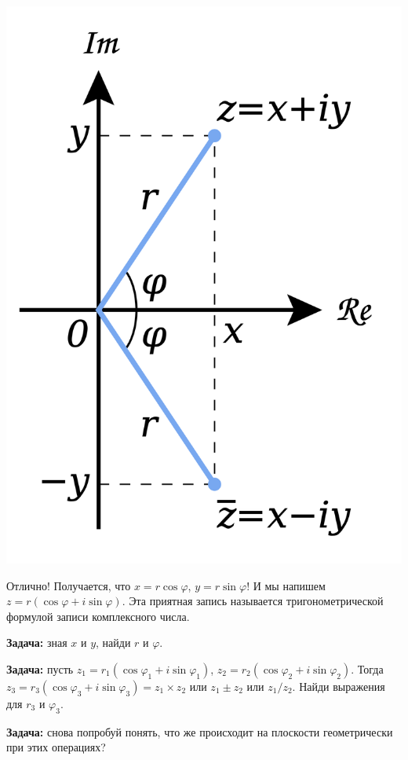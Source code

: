 \documentclass[12pt]{article}
\begin{document}
\begin{center}
\includegraphics[scale=0.1]{cn_plane_phi.png}
\end{center}

Отлично! Получается, что $x = r \cos \varphi$, $y = r \sin \varphi$! И мы напишем $z = r \left( \cos \varphi + i \sin \varphi \right)$. Эта приятная запись называется тригонометрической формулой записи комплексного числа.

{\bf Задача:} зная $x$ и $y$, найди $r$ и $\varphi$.

{\bf Задача:} пусть $z_1 = r_1 \left( \cos \varphi_1 + i \sin \varphi_1 \right)$, $z_2 = r_2 \left( \cos \varphi_2 + i \sin \varphi_2 \right)$. Тогда $z_3 = r_3 \left( \cos \varphi_3 + i \sin \varphi_3 \right) = z_1 \times z_2$ или $z_1 \pm z_2$ или $z_1 / z_2$. Найди выражения для $r_3$ и $\varphi_3$.

{\bf Задача:} снова попробуй понять, что же происходит на плоскости геометрически при этих операциях?
\end{document}
